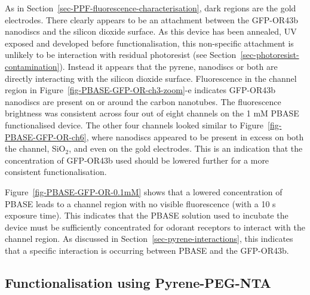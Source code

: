 \documentclass[
  a4paper,
]{scrbook}
\begin{document}
As in Section~\ref{sec-PPF-fluorescence-characterisation}, dark regions
are the gold electrodes. There clearly appears to be an attachment
between the GFP-OR43b nanodiscs and the silicon dioxide surface. As this
device has been annealed, UV exposed and developed before
functionalisation, this non-specific attachment is unlikely to be
interaction with residual photoresist (see
Section~\ref{sec-photoresist-contamination}). Instead it appears that
the pyrene, nanodiscs or both are directly interacting with the silicon
dioxide surface. Fluorescence in the channel region in
Figure~\ref{fig-PBASE-GFP-OR-ch3-zoom}-e indicates GFP-OR43b nanodiscs
are present on or around the carbon nanotubes. The fluorescence
brightness was consistent across four out of eight channels on the 1 mM
PBASE functionalised device. The other four channels looked similar to
Figure~\ref{fig-PBASE-GFP-OR-ch6}, where nanodiscs appeared to be
present in excess on both the channel, SiO\(_2\), and even on the gold
electrodes. This is an indication that the concentration of GFP-OR43b
used should be lowered further for a more consistent functionalisation.

Figure~\ref{fig-PBASE-GFP-OR-0.1mM} shows that a lowered concentration
of PBASE leads to a channel region with no visible fluorescence (with a
10 s exposure time). This indicates that the PBASE solution used to
incubate the device must be sufficiently concentrated for odorant
receptors to interact with the channel region. As discussed in
Section~\ref{sec-pyrene-interactions}, this indicates that a specific
interaction is occurring between PBASE and the GFP-OR43b.

\hypertarget{sec-NTA-functionalisation}{%
\subsection{Functionalisation using
Pyrene-PEG-NTA}\label{sec-NTA-functionalisation}}
\end{document}

